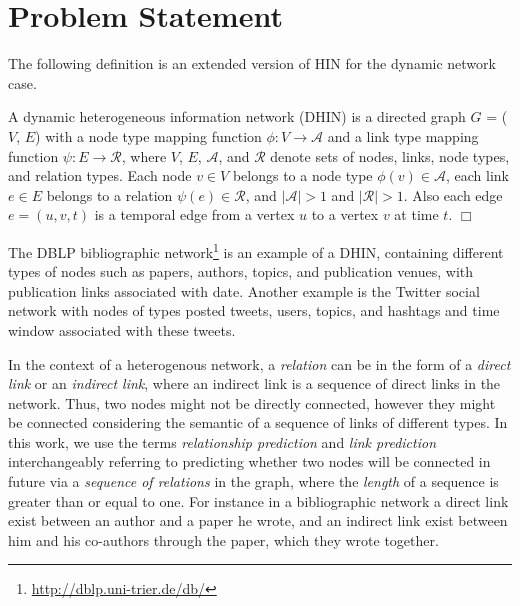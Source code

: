 \section{Problem Statement}

The following definition is an extended version of HIN \cite{sun2011pathsim} for the dynamic network case.

\begin{definition}
A dynamic heterogeneous information network (DHIN) is a directed graph $G$ = ($V$, $E$) with a node type mapping function $\phi: V \rightarrow \mathcal{A}$ and a link type mapping function $\psi: E \rightarrow \mathcal{R}$, where $V$, $E$, $\mathcal{A}$, and $\mathcal{R}$ denote sets of nodes, links, node types, and relation types. Each node $v \in V$ belongs to a node type $\phi(v) \in \mathcal{A}$, each link $e \in E$ belongs to a relation $\psi(e) \in \mathcal{R}$, and $|\mathcal{A}| > 1$ and $|\mathcal{R}| > 1$. Also each edge $e = (u, v, t)$ is a temporal edge from a vertex $u$ to a vertex $v$ at time $t$. 
$\Box$ 

\end{definition}

The DBLP bibliographic network\footnote{\url{http://dblp.uni-trier.de/db/}} is an example of a DHIN, containing different types of nodes such as papers, authors, topics, and publication venues, with publication links associated with date. Another example is the Twitter social network with nodes of types posted tweets, users, topics, and hashtags and time window associated with these tweets. %

In the context of a heterogenous network, a \textit{relation} can be in the form of a \textit{direct link} or an \textit{indirect link}, where an indirect link is a sequence of direct links in the network. Thus, two nodes might not be directly connected, however they might be connected considering the semantic of a sequence of links of different types. In this work, we use the terms \textit{relationship prediction} and \textit{link prediction} interchangeably referring to predicting whether two nodes will be connected in future via a \textit{sequence of relations} in the graph, where the \textit{length} of a sequence is greater than or equal to one. For instance in a bibliographic network a direct link exist between an author and a paper he wrote, and an indirect link exist between him and his co-authors through the paper, which they wrote together.

